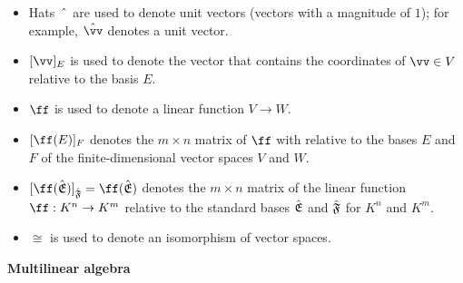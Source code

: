 \begin{itemize}
    \item Hats $\text{ } \hat{} \text{ }$ are used to denote unit vectors (vectors with a magnitude of $1$); for example, $\hat{\vv}$ denotes a unit vector.
    \item $[\vv]_E$ is used to denote the vector that contains the coordinates of $\vv \in V$ relative to the basis $E$.
    \item $\ff$ is used to denote a linear function $V \rightarrow W$.
    \item $[\ff(E)]_F$ denotes the $m \times n$ matrix of $\ff$ with relative to the bases $E$ and $F$ of the finite-dimensional vector spaces $V$ and $W$.
    \item  $[\ff(\sE)]_\sF = \ff(\sE)$ denotes the $m \times n$ matrix of the linear function $\ff:K^n \rightarrow K^m$ relative to the standard bases ${\hat{\mathfrak{E}}}$ and ${\hat{\mathfrak{F}}}$ for $K^n$ and $K^m$.
    \item $\cong$ is used to denote an isomorphism of vector spaces.
\end{itemize}

\textbf{Multilinear algebra}


